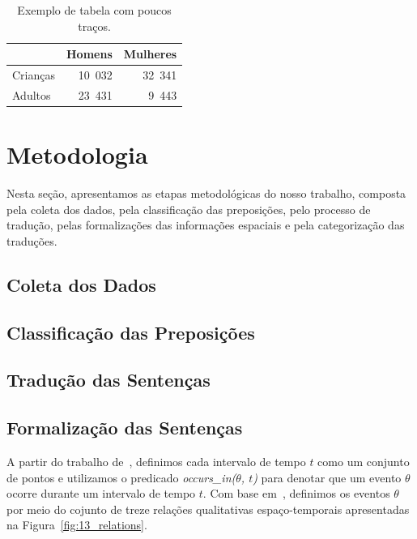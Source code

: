 \documentclass[a4paper, twocolumn, 11pt, twoside]{article}
\begin{document}
\begin{table}[htb]
  \centering
  \begin{tabular}{lrr}
    \toprule
    & \textbf{Homens} & \textbf{Mulheres} \\
    \midrule
    Crianças & 10~032 & 32~341 \\
    Adultos & 23~431 & 9~443 \\
    \bottomrule
  \end{tabular}
  \caption{Exemplo de tabela com poucos traços.}
  \label{tab:1}
\end{table}

\section{Metodologia}
Nesta seção, apresentamos as etapas metodológicas do nosso trabalho, composta pela coleta dos dados, pela classificação das preposições, pelo processo de tradução, pelas formalizações das informações espaciais e pela categorização das traduções. 

\subsection{Coleta dos Dados}

\subsection{Classificação das Preposições}

\subsection{Tradução das Sentenças}


\subsection{Formalização das Sentenças}

A partir do trabalho de~\citet{spranger2016robust}, definimos cada intervalo de tempo $t$ como um conjunto de pontos e utilizamos o predicado \textit{occurs\_in($\theta$, $t$)} para denotar que um evento $\theta$ ocorre durante um intervalo de tempo $t$.
Com base em~\citet{freksa2016neighborhood}, definimos os eventos $\theta$ por meio do cojunto de treze relações qualitativas espaço-temporais apresentadas na Figura~\ref{fig:13_relations}.
\end{document}
